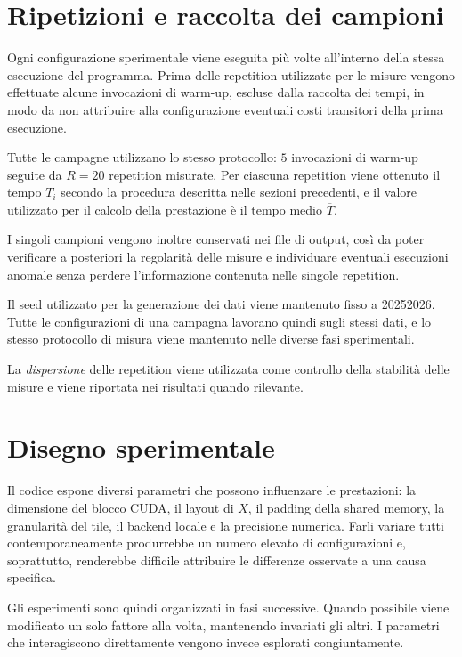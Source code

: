 \section{Ripetizioni e raccolta dei campioni}
\label{sec:stabilita-misure}

Ogni configurazione sperimentale viene eseguita più volte all'interno
della stessa esecuzione del programma. Prima delle repetition utilizzate
per le misure vengono effettuate alcune invocazioni di warm-up, escluse
dalla raccolta dei tempi, in modo da non attribuire alla configurazione
eventuali costi transitori della prima esecuzione.

Tutte le campagne utilizzano lo stesso protocollo: $5$ invocazioni di
warm-up seguite da $R=20$ repetition misurate. Per ciascuna repetition
viene ottenuto il tempo $T_i$ secondo la procedura descritta nelle sezioni
precedenti, e il valore utilizzato per il calcolo della prestazione è il
tempo medio $\overline{T}$.

I singoli campioni vengono inoltre conservati nei file di output, così da
poter verificare a posteriori la regolarità delle misure e individuare
eventuali esecuzioni anomale senza perdere l'informazione contenuta nelle
singole repetition.

Il seed utilizzato per la generazione dei dati viene mantenuto fisso a
\num{20252026}. Tutte le configurazioni di una campagna lavorano quindi
sugli stessi dati, e lo stesso protocollo di misura viene mantenuto nelle
diverse fasi sperimentali.

La \emph{dispersione} delle repetition viene utilizzata come controllo della
stabilità delle misure e viene riportata nei risultati quando rilevante.

\section{Disegno sperimentale}
\label{sec:disegno-fasi}
\label{sec:campagne-sperimentali}

Il codice espone diversi parametri che possono influenzare le prestazioni:
la dimensione del blocco CUDA, il layout di $X$, il padding della shared
memory, la granularità del tile, il backend locale e la precisione
numerica. Farli variare tutti contemporaneamente produrrebbe un numero
elevato di configurazioni e, soprattutto, renderebbe difficile attribuire
le differenze osservate a una causa specifica.


Gli esperimenti sono quindi organizzati in fasi successive. Quando
possibile viene modificato un solo fattore alla volta, mantenendo invariati
gli altri. I parametri che interagiscono direttamente vengono invece
esplorati congiuntamente.

